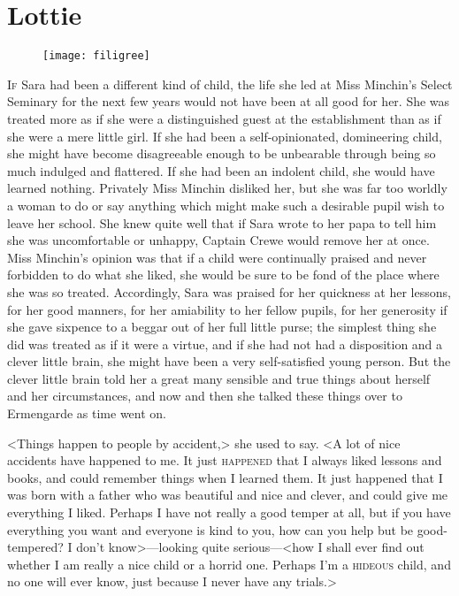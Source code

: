\chapter{Lottie}

\begin{figure}[t!]
\centering
\texttt{[image: filigree]}
\end{figure}

\lettrine[lines=5]{I}{f} Sara had been a different kind of child, the life she led at Miss Minchin's Select Seminary for the next few years would not have been at all good for her. She was treated more as if she were a distinguished guest at the establishment than as if she were a mere little girl. If she had been a self-opinionated, domineering child, she might have become disagreeable enough to be unbearable through being so much indulged and flattered. If she had been an indolent child, she would have learned nothing. Privately Miss Minchin disliked her, but she was far too worldly a woman to do or say anything which might make such a desirable pupil wish to leave her school. She knew quite well that if Sara wrote to her papa to tell him she was uncomfortable or unhappy, Captain Crewe would remove her at once. Miss Minchin's opinion was that if a child were continually praised and never forbidden to do what she liked, she would be sure to be fond of the place where she was so treated. Accordingly, Sara was praised for her quickness at her lessons, for her good manners, for her amiability to her fellow pupils, for her generosity if she gave sixpence to a beggar out of her full little purse; the simplest thing she did was treated as if it were a virtue, and if she had not had a disposition and a clever little brain, she might have been a very self-satisfied young person. But the clever little brain told her a great many sensible and true things about herself and her circumstances, and now and then she talked these things over to Ermengarde as time went on.

<Things happen to people by accident,> she used to say. <A lot of nice accidents have happened to me. It just \textsc{happened} that I always liked lessons and books, and could remember things when I learned them. It just happened that I was born with a father who was beautiful and nice and clever, and could give me everything I liked. Perhaps I have not really a good temper at all, but if you have everything you want and everyone is kind to you, how can you help but be good-tempered? I don't know>—looking quite serious—<how I shall ever find out whether I am really a nice child or a horrid one. Perhaps I'm a \textsc{hideous} child, and no one will ever know, just because I never have any trials.>

